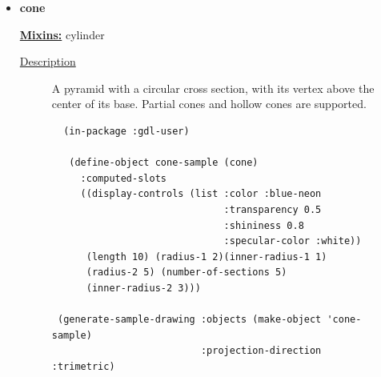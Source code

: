 \documentclass [11pt]{book}
\begin{document}
\begin{itemize}







\item {}
\label{prim:cone}
\textbf{cone}


\textbf{
\underline{Mixins:}} cylinder





\begin{description}

\item [
\underline{Description}]


A pyramid with a circular cross section, with its vertex above 
the center of its base. Partial cones and hollow cones are supported.



\end{description}




\begin{figure}
\begin{lrbox}{\boxedverb}
\begin{minipage}{\linewidth}
{\small

\begin{verbatim}
  (in-package :gdl-user)

   (define-object cone-sample (cone)
     :computed-slots
     ((display-controls (list :color :blue-neon 
                              :transparency 0.5 
                              :shininess 0.8 
                              :specular-color :white))
      (length 10) (radius-1 2)(inner-radius-1 1)
      (radius-2 5) (number-of-sections 5)
      (inner-radius-2 3)))
  
 (generate-sample-drawing :objects (make-object 'cone-sample) 
                          :projection-direction :trimetric) 
  

\end{verbatim}}
\end{minipage}
\end{lrbox}
\end{figure}
\end{itemize}
\end{document}
